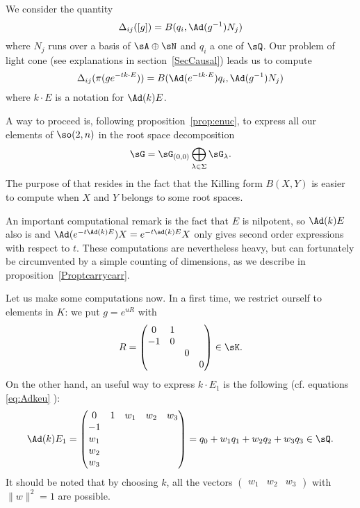 We consider the quantity
\[
	\Delta_{ij}([g])=B(q_i,\Ad(g^{-1})N_j)
\]
where $N_j$ runs over a basis of $\sA\oplus\sN$ and $q_i$ a one of $\sQ$. Our problem of light cone (see explanations in section~\ref{SecCausal}) leads us to compute
\begin{equation} \label{eq:elemtr}
	\Delta_{ij}(\pi(ge^{-tk\cdot E}))=B(\Ad(e^{-tk\cdot
		E})q_i,\Ad(g^{-1})N_j)
\end{equation}
where $k\cdot E$ is a notation for $\Ad(k)E$.

A way to proceed is, following proposition~\ref{prop:enuc},  to express all our elements of $\so(2,n)$ in the root space decomposition
\[
	\sG=\sG_{(0,0)}\bigoplus_{\lambda\in\Sigma}\sG_{\lambda}.
\]
The purpose of that resides in the fact that the Killing form $B(X,Y)$ is easier to compute when $X$ and $Y$ belongs to some root spaces.

An important computational remark is the fact that $E$ is nilpotent, so $\Ad(k)E$ also is and $\Ad(e^{-t\Ad(k)E})X=e^{-t\ad(k)E}X$ only gives second order expressions with respect to $t$. These computations are nevertheless heavy, but can fortunately be circumvented by a simple counting of dimensions, as we describe in proposition~\ref{Proptcarrycarr}.

Let us make some computations now. In a first time, we restrict ourself to elements in $K$: we put $g=e^{uR}$ with
\[
	R=
	\begin{pmatrix}
		0  & 1         \\
		-1 & 0         \\
		   &   & 0     \\
		   &   &   & 0
	\end{pmatrix}\in\sK.
\]
On the other hand, an useful way to express $k\cdot E_1$ is the following (cf. equations \eqref{eq:Adkeu} ):
\[
	\Ad(k)E_1=
	\begin{pmatrix}
		0 & 1 & w_1 & w_2 & w_3 \\
		-1                      \\
		w_1                     \\
		w_2                     \\
		w_3
	\end{pmatrix}
	=q_0+w_1q_1+w_2q_2+w_3q_3\in \sQ.
\]
It should be noted that by choosing $k$, all the vectors $\begin{pmatrix}w_1&w_2&w_3\end{pmatrix}$ with $\|w\|^2=1$ are possible.

